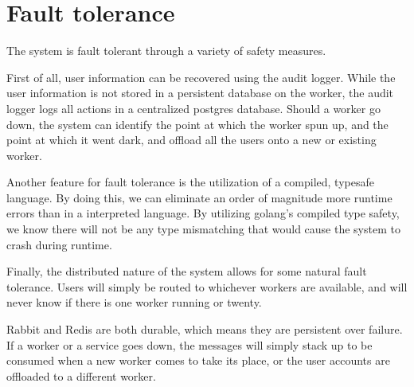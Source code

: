 \chapter{Fault tolerance}
The system is fault tolerant through a variety of safety measures.

First of all, user information can be recovered using the audit logger. While the user information is not stored in a persistent database on the worker, the audit logger logs all actions in a centralized postgres database. Should a worker go down, the system can identify the point at which the worker spun up, and the point at which it went dark, and offload all the users onto a new or existing worker.

Another feature for fault tolerance is the utilization of a compiled, typesafe language. By doing this, we can eliminate an order of magnitude more runtime errors than in a interpreted language. By utilizing golang’s compiled type safety, we know there will not be any type mismatching that would cause the system to crash during runtime.

Finally, the distributed nature of the system allows for some natural fault tolerance. Users will simply be routed to whichever workers are available, and will never know if there is one worker running or twenty. 

Rabbit and Redis are both durable, which means they are persistent over failure. If a worker or a service goes down, the messages will simply stack up to be consumed when a new worker comes to take its place, or the user accounts are offloaded to a different worker.